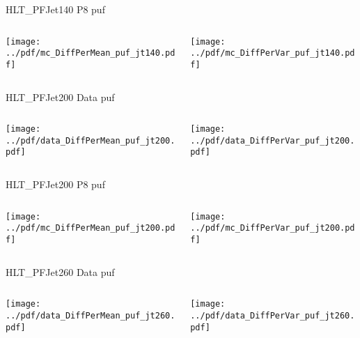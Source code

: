 \documentclass[9pt]{beamer}
\begin{document}
\begin{frame}[t]{HLT\_PFJet140 P8 puf}
\begin{columns}[T]
  \begin{column}{.5\textwidth}
  \texttt{[image: ../pdf/mc\_DiffPerMean\_puf\_jt140.pdf]}
  \end{column}
  \begin{column}{.5\textwidth}
  \texttt{[image: ../pdf/mc\_DiffPerVar\_puf\_jt140.pdf]}
  \end{column}
\end{columns}
\end{frame}

\begin{frame}[t]{HLT\_PFJet200 Data puf}
\begin{columns}[T]
  \begin{column}{.5\textwidth}
  \texttt{[image: ../pdf/data\_DiffPerMean\_puf\_jt200.pdf]}
  \end{column}
  \begin{column}{.5\textwidth}
  \texttt{[image: ../pdf/data\_DiffPerVar\_puf\_jt200.pdf]}
  \end{column}
\end{columns}
\end{frame}

\begin{frame}[t]{HLT\_PFJet200 P8 puf}
\begin{columns}[T]
  \begin{column}{.5\textwidth}
  \texttt{[image: ../pdf/mc\_DiffPerMean\_puf\_jt200.pdf]}
  \end{column}
  \begin{column}{.5\textwidth}
  \texttt{[image: ../pdf/mc\_DiffPerVar\_puf\_jt200.pdf]}
  \end{column}
\end{columns}
\end{frame}

\begin{frame}[t]{HLT\_PFJet260 Data puf}
\begin{columns}[T]
  \begin{column}{.5\textwidth}
  \texttt{[image: ../pdf/data\_DiffPerMean\_puf\_jt260.pdf]}
  \end{column}
  \begin{column}{.5\textwidth}
  \texttt{[image: ../pdf/data\_DiffPerVar\_puf\_jt260.pdf]}
  \end{column}
\end{columns}
\end{frame}
\end{document}
